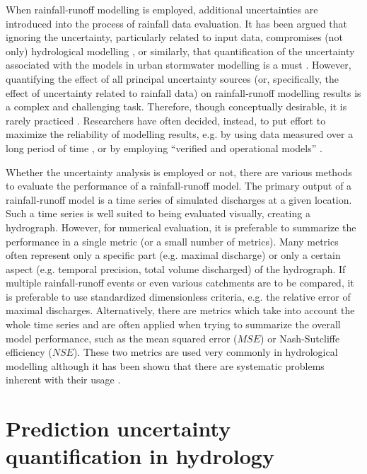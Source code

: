 \documentclass{ctuthesis}\usepackage[]{graphicx}\usepackage[]{color}
\begin{document}
When rainfall‐runoff modelling is employed, additional uncertainties are introduced into the process of rainfall data evaluation. It has been argued that ignoring the uncertainty, particularly related to input data, compromises (not only) hydrological modelling \citep{beven2006undermining, kavetskiBayesianAnalysisInput2006}, or similarly, that quantification of the uncertainty associated with the models in urban stormwater modelling is a must \citep{dotto2012comparison}. However, quantifying the effect of all principal uncertainty sources (or, specifically, the effect of
uncertainty related to rainfall data) on rainfall‐runoff modelling results is a complex and challenging
task. Therefore, though conceptually desirable, it is rarely practiced \citep{dotto2012comparison}. Researchers have often decided, instead, to put effort to maximize the reliability of modelling results, e.g. by using data measured over a long period of time \citep{segondSignificanceSpatialRainfall2007}, or by employing “verified and operational models” \citep{ochoa-rodriguezImpactSpatialTemporal2015}.

Whether the uncertainty analysis is employed or not, there are various methods to evaluate the
performance of a rainfall‐runoff model. The primary output of a rainfall‐runoff model is a time series
of simulated discharges at a given location. Such a time series is well suited to being evaluated
visually, creating a hydrograph. However, for numerical evaluation, it is preferable to summarize the
performance in a single metric (or a small number of metrics). Many metrics often represent only a
specific part (e.g. maximal discharge) or only a certain aspect (e.g. temporal precision, total volume
discharged) of the hydrograph. If multiple rainfall‐runoff events or even various catchments are to be
compared, it is preferable to use standardized dimensionless criteria, e.g. the relative error of
maximal discharges. Alternatively, there are metrics which take into account the whole time series
and are often applied when trying to summarize the overall model performance, such as the mean
squared error ($M\!S\!E$) or Nash‐Sutcliffe efficiency ($N\!S\!E$). These two metrics are used very commonly in hydrological modelling although it has been shown that there are systematic problems inherent with their usage \citep{guptaDecompositionMeanSquared2009}.



\section{Prediction uncertainty quantification in hydrology} \label{PredUncQuant}
\end{document}
